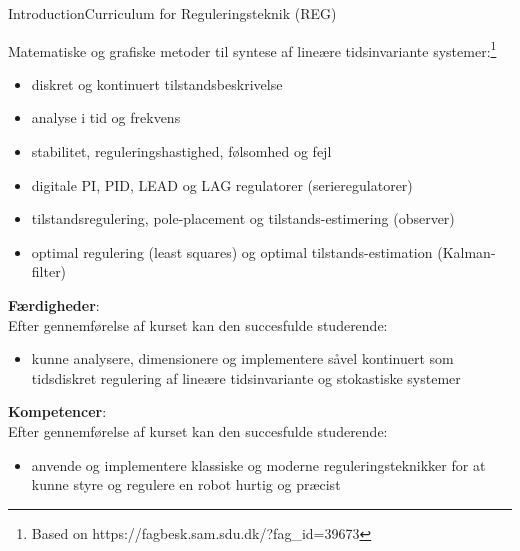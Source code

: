 \documentclass[aspectratio=169,10pt,t]{beamer}
\begin{document}
\begin{frame}{Introduction}{Curriculum for Reguleringsteknik (REG)\vphantom{(y}}
\vspace{-0.7em}
{\footnotesize Matematiske og grafiske metoder til syntese af {\color{red}lineære tidsinvariante systemer}:\footnote{{\tiny Based on https://fagbesk.sam.sdu.dk/?fag\_id=39673}}
\begin{itemize}
\item {\color{red}diskret og kontinuert tilstandsbeskrivelse}
\item analyse i tid og frekvens
\item stabilitet, reguleringshastighed, følsomhed og fejl
\item digitale PI, PID, LEAD og LAG regulatorer (serieregulatorer)
\item tilstandsregulering, pole-placement og tilstands-estimering (observer)
\item optimal regulering (least squares) og optimal tilstands-estimation (Kalman-filter)
\end{itemize}
\vspace{0.5em}
\textbf{Færdigheder}:\\
Efter gennemførelse af kurset kan den succesfulde studerende:
\begin{itemize}
\item kunne analysere, dimensionere og implementere såvel kontinuert som tidsdiskret regulering af lineære tidsinvariante og stokastiske systemer
\end{itemize}
\vspace{0.5em}
\textbf{Kompetencer}:\\
Efter gennemførelse af kurset kan den succesfulde studerende:
\begin{itemize}
\item anvende og implementere klassiske og moderne reguleringsteknikker for at kunne styre og regulere en robot hurtig og præcist
\end{itemize}}
\end{frame}
\end{document}
